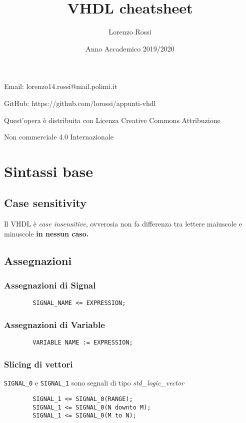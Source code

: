 \documentclass{article}
\title{\Huge VHDL cheatsheet}
\author{\LARGE Lorenzo Rossi}
\date{\LARGE Anno Accademico 2019/2020}
\begin{document}
\maketitle

\vspace{15em}

\large
\begin{doublespacing}
  \centerline{Email: lorenzo14.rossi@mail.polimi.it}
  \centerline{GitHub: https://github.com/lorossi/appunti-vhdl}

  \vspace{16em}
  \centerline{Quest'opera è distribuita con Licenza Creative Commons Attribuzione}
  \centerline{Non commerciale 4.0 Internazionale \ccbynceu}
\end{doublespacing}
\newpage



\tableofcontents
\clearpage
{}
\newpage

\section{Sintassi base}
\subsection{Case sensitivity}
Il VHDL è \textit{case insensitive}, ovverosia non fa differenza tra lettere maiuscole e minuscole \textbf{in nessun caso.}
\subsection{Assegnazioni}
\subsubsection{Assegnazioni di Signal}
\begin{verbatim}
	    SIGNAL_NAME <= EXPRESSION;
\end{verbatim}
\subsubsection{Assegnazioni di Variable}
\begin{verbatim}
	    VARIABLE NAME := EXPRESSION;
\end{verbatim}
\subsubsection{Slicing di vettori}
\texttt{SIGNAL\_0} e \texttt{SIGNAL\_1} sono segnali di tipo \textit{std\_logic\_vector}
\begin{verbatim}
	    SIGNAL_1 <= SIGNAL_0(RANGE);
	    SIGNAL_1 <= SIGNAL_0(N downto M);
	    SIGNAL_1 <= SIGNAL_0(M to N);
\end{verbatim}
\end{document}
